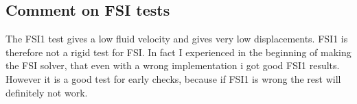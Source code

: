 \subsection*{Comment on FSI tests}
The FSI1 test gives a low fluid velocity and gives very low displacements. FSI1 is therefore not a rigid test for FSI. In fact I experienced in the beginning of making the FSI solver, that even with a wrong implementation i got good FSI1 results. However it is a good test for early checks, because if FSI1 is wrong the rest will definitely not work.  \newline

